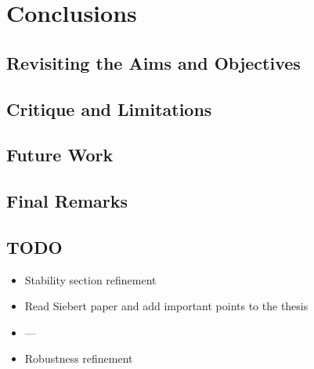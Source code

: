 \chapter{Conclusions}

\section{Revisiting the Aims and Objectives}

\section{Critique and Limitations}

\section{Future Work}

\section{Final Remarks}

\section{TODO}

\begin{itemize}
    \item Stability section refinement
    \item Read Siebert paper and add important points to the thesis
    \item  ---
    \item Robustness refinement
\end{itemize}
